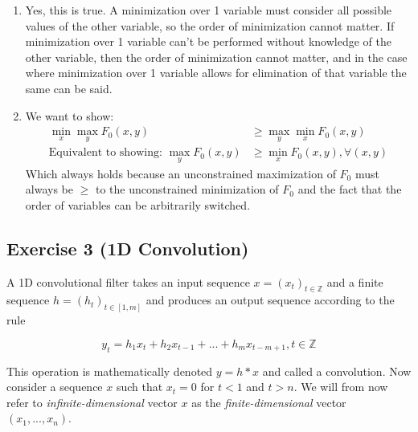 \documentclass[11pt]{article}
\begin{document}
\begin{solution}
\begin{enumerate}
\item Yes, this is true. A minimization over 1 variable must consider all possible values of the other variable, so the order of minimization cannot matter. If minimization over 1 variable can't be performed without knowledge of the other variable, then the order of minimization cannot matter, and in the case where minimization over 1 variable allows for elimination of that variable the same can be said.

\item We want to show:
    \begin{align*}
        \min_x \max_y F_0(x, y) &\geq \max_y \min_x F_0(x, y) \\
        \text{Equivalent to showing: } \max_y F_0(x, y) &\geq \min_x F_0(x, y) , \forall (x, y)
    \end{align*}
    Which always holds because an unconstrained maximization of $F_0$ must always be $\geq$ to the unconstrained minimization of $F_0$ and the fact that the order of variables can be arbitrarily switched.
\end{enumerate}
\end{solution}

\newpage
\subsection*{Exercise 3 (1D Convolution)}

A 1D convolutional filter takes an input sequence $x = (x_t)_{t \in \mathbb{Z}}$ and a finite sequence $h = (h_t)_{t \in [1, m]}$ and produces an output sequence according to the rule

\[y_t = h_1x_t + h_2x_{t-1} + ... + h_mx_{t-m+1},  t \in \mathbb{Z}\]

This operation is mathematically denoted $y = h * x$ and called a convolution. Now consider a sequence $x$ such that $x_t = 0$ for $t < 1$ and $t > n$. We will from now refer to \emph{infinite-dimensional} vector $x$ as the \emph{finite-dimensional} vector $(x_1, ..., x_n)$.
\end{document}
